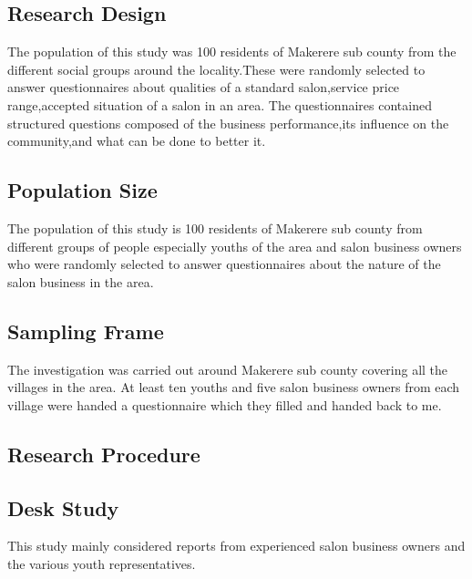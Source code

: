 \documentclass[11pt]{article}
\begin{document}
\subsection{Research Design}
The population of this study was 100 residents of Makerere sub county from the different social groups around the locality.These were randomly selected to answer questionnaires about qualities of a standard salon,service price range,accepted situation of a salon in an area. The questionnaires contained structured questions composed of the business performance,its influence on the community,and what can be done to\cite{stockdale2012identifying} better it.
\subsection{Population Size}
The population of this study is 100 residents of Makerere sub county from different groups of people especially youths of the area and salon business owners who were randomly selected to answer questionnaires about the nature of the salon business in the area. 
\subsection{Sampling Frame}
The investigation was carried out around Makerere sub county covering all the villages in the area. At least ten youths and five salon business owners from each village were handed a questionnaire which they filled and handed back to me.
\subsection{Research Procedure}
\subsection{Desk Study}
This study mainly considered reports from experienced salon business owners and the various youth representatives.
\end{document}
